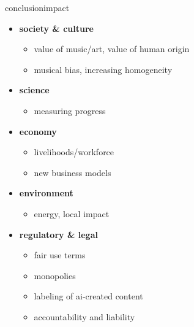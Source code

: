 
\begin{frame}{conclusion}{impact}
    \begin{itemize}
        \item \textbf{society \& culture}
            \begin{itemize}
                \item value of music/art, value of human origin
                \item musical bias, increasing homogeneity
            \end{itemize}
        \item \textbf{science} 
            \begin{itemize}
                \item measuring progress
            \end{itemize}
        \item \textbf{economy}
            \begin{itemize}
                \item livelihoods/workforce
                \item new business models
            \end{itemize}
        \item \textbf{environment}
            \begin{itemize}
                \item energy, local impact
            \end{itemize}
        \item \textbf{regulatory \& legal}
                \begin{itemize}
                    \item fair use terms
                    \item monopolies
                    \item labeling of ai-created content
                    \item accountability and liability
                \end{itemize}
    \end{itemize}
\end{frame}

